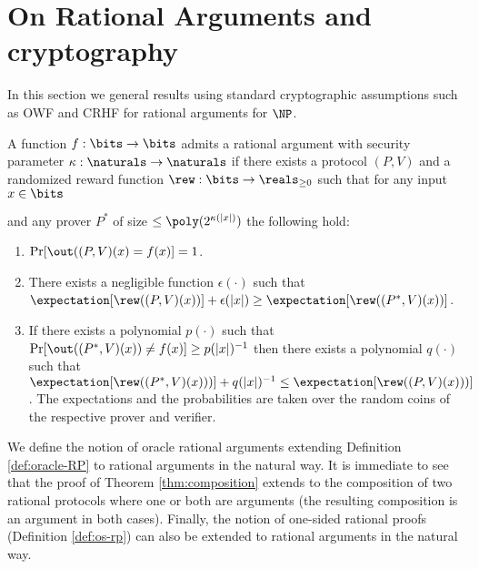 \section{On Rational Arguments and cryptography}
\label{sec:ratarg}

In this section we general results using standard cryptographic assumptions such as OWF and CRHF for rational arguments for $\NP$.


\begin{definition}
	A function $f : \bits  \to \bits$ admits
a rational
	argument with security parameter $\kappa : \naturals \to \naturals$  if there exists a protocol $(P,V)$ and a
	randomized reward function $\rew : \bits \to \reals_{\geq 0}$
	such that for any input $x \in \bits$
	
	and any prover $P^*$ of size $\leq \poly(2^{\kappa(|x|)})$ the following hold:
	\begin{enumerate}
		\item $\Pr[\out((P,V)(x) = f(x)] = 1$.
		\item There exists a negligible function $\epsilon(\cdot)$  such that $\expectation[\rew((P,V)(x))] + \epsilon(|x|) \geq \expectation[\rew((P^*, V)(x))]$.
		\item If there exists a polynomial $p(\cdot)$ such that
		$\Pr[\out((P^*, V)(x))\not = f(x)] \geq p(|x|)^{-1}$ then there exists a polynomial $q(\cdot)$ such that
		$\expectation[\rew((P^*, V)(x)))] + q(|x|)^{-1} \leq \expectation[\rew((P, V)(x)))] $.
		The expectations and the probabilities are taken over the random coins of the respective prover and verifier.
	\end{enumerate}
\end{definition}

\begin{remark}
	\label{rem:oracle-rat-args}
	\label{rem:os-rat-args}
	We define the notion of oracle rational arguments extending Definition \ref{def:oracle-RP} to rational arguments in the natural way.
	It is immediate to see that the proof of Theorem \ref{thm:composition} extends to the composition of two rational protocols where one or both are arguments
	(the resulting composition is an argument in both cases).
	Finally, the notion of one-sided rational proofs (Definition \ref{def:os-rp}) can also be extended to rational arguments in the natural way.
\end{remark}

